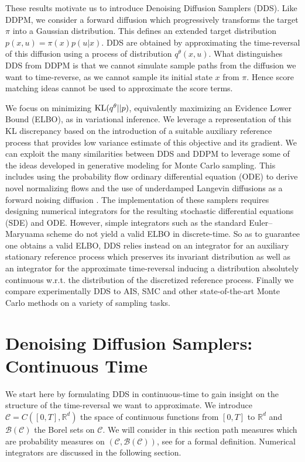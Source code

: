 \documentclass{article} %
\begin{document}
These results motivate us to introduce Denoising Diffusion Samplers (DDS). Like DDPM, we consider a forward diffusion which progressively transforms the target $\pi$ into a Gaussian distribution. This defines an extended target distribution $p(x,u)=\pi(x)p(u|x)$. DDS are obtained by approximating the time-reversal of this diffusion using a process of distribution $q^{\theta}(x,u)$. What distinguishes DDS from DDPM is that we cannot simulate sample paths from the diffusion we want to time-reverse, as we cannot sample its initial state $x$ from $\pi$. Hence score matching ideas cannot be used to approximate the score terms. 

We focus on minimizing $\mathrm{KL}(q^{\theta}||p)$, equivalently maximizing an Evidence Lower Bound (ELBO), as in variational inference. We leverage a representation of this KL discrepancy based on the introduction of a suitable auxiliary reference process that provides low variance estimate of this objective and its gradient. We can exploit the many similarities between DDS and DDPM to leverage some of the ideas developed in generative modeling for Monte Carlo sampling. This includes using the probability flow ordinary differential equation (ODE) \citep{song2020score} to derive novel normalizing flows and the use of underdamped Langevin diffusions as a forward noising diffusion \citep{Dockhorn2022}. The implementation of these samplers requires designing numerical integrators for the resulting stochastic differential equations (SDE) and ODE. However, simple  integrators such as the standard Euler--Maryuama scheme do not yield a valid ELBO in discrete-time. So as to guarantee one obtains a valid ELBO, DDS relies instead on an integrator for an auxiliary stationary reference process which preserves its invariant distribution as well as an integrator for the approximate time-reversal inducing a distribution absolutely continuous w.r.t. the distribution of the discretized reference process. Finally we compare experimentally DDS to AIS, SMC and other state-of-the-art Monte Carlo methods on a variety of sampling tasks.

\section{Denoising Diffusion Samplers: Continuous Time}\label{sec:DDSCT}
We start here by formulating DDS in continuous-time to gain insight on the structure of the time-reversal we want to approximate. We introduce $\mathcal{C}=C([0,T],\mathbb{R}^d)$ the space of continuous functions from $[0,T]$ to $\mathbb{R}^d$ and $\mathcal{B}(\mathcal{C})$ the Borel sets on $\mathcal{C}$. We will consider in this section path measures which are probability measures on $(\mathcal{C},\mathcal{B}(\mathcal{C}))$, see \cite{leonard2013survey} for a formal definition. Numerical integrators are discussed in the following section. 
\end{document}
